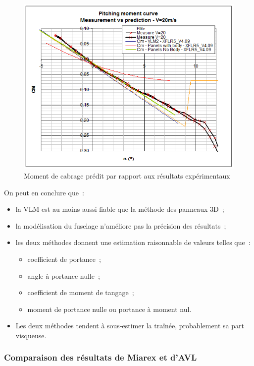 \documentclass[a4paper,twoside,12pt,dvips]{article}
\begin{document}
\begin{figure}[htbp]
  \centering 
  \includegraphics[width=0.8\linewidth]{img-39}
  \caption{Moment de cabrage prédit par rapport aux résultats expérimentaux}
  \label{img:moment_cabrage_prédit_résultats_expérimentaux}
\end{figure}

\pagebreak

On peut en conclure que~:

\begin{itemize}
  \item la VLM est au moins aussi fiable que la méthode des panneaux 3D~;
  \item la modélisation du fuselage n’améliore pas la précision des
  résultats~;
  \item les deux méthodes donnent une estimation raisonnable de valeurs
  telles que~:
  \begin{itemize}
    \item coefficient de portance~;
    \item angle à portance nulle~;
    \item coefficient de moment de tangage~;
    \item moment de portance nulle ou portance à moment nul.
  \end{itemize}
  \item Les deux méthodes tendent à sous-estimer la traînée, probablement sa
  part visqueuse.
\end{itemize}

\subsubsection {Comparaison des résultats de Miarex et d’AVL}
\end{document}
